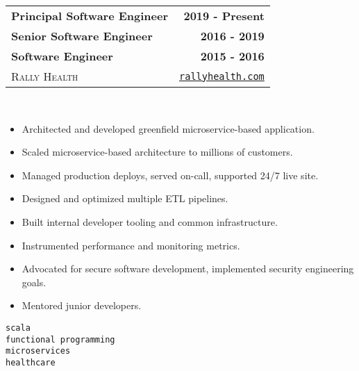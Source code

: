 \documentclass[10pt,letterpaper]{article}
\newenvironment{details}
{\begin{itemize}}
{\end{itemize}}
\begin{document}
  \noindent\begin{tabularx}{\textwidth}{@{}X r@{}}
    \textbf{Principal Software Engineer} & \textbf{2019 - Present} \\
    \textbf{Senior Software Engineer} & \textbf{2016 - 2019} \\
    \textbf{Software Engineer} & \textbf{2015 - 2016} \\
    \textsc{Rally Health} & \texttt{\href{http://rallyhealth.com}{rallyhealth.com}}
  \end{tabularx}
  \hfill\\
  \noindent\begin{minipage}[t]{\dimexpr.7\textwidth-.7\columnsep}
    \raggedright
    \begin{details}
    \item Architected and developed greenfield microservice-based application.
    \item Scaled microservice-based architecture to millions of customers.
    \item Managed production deploys, served on-call, supported 24/7 live site.
    \item Designed and optimized multiple ETL pipelines.
    \item Built internal developer tooling and common infrastructure.
    \item Instrumented performance and monitoring metrics.
    \item Advocated for secure software development, implemented security engineering goals.
    \item Mentored junior developers.
    \end{details}
  \end{minipage}%
  \begin{minipage}[t]{\dimexpr.32\textwidth-.32\columnsep}
    \raggedleft
    \texttt{scala} \\
    \texttt{functional programming} \\
    \texttt{microservices} \\
    \texttt{healthcare}
  \end{minipage}

  \hfill\\
\end{document}
